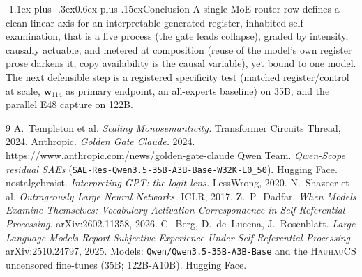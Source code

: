 \documentclass[10pt]{article}
\makeatletter
\renewcommand\section{\@startsection{section}{1}{\z@}%
  {-1.1ex plus -.3ex}{0.6ex plus .15ex}{\normalfont\large\bfseries}}
\newcommand{\wvec}{\mathbf{w}_{114}}
\makeatother
\begin{document}
\vspace{-0.4em}
\section{Conclusion}
\vspace{-0.2em}
A single MoE router row defines a clean linear axis for an interpretable generated
register, inhabited self-examination, that is a live process (the gate leads
collapse), graded by intensity, causally actuable, and metered at composition
(reuse of the model's own register prose darkens it; copy availability is the
causal variable), yet bound to one model. The
next defensible step is a registered specificity test (matched register/control at
scale, $\wvec$ as primary endpoint, an all-experts baseline) on 35B, and the
parallel E48 capture on 122B.

\vspace{-0.5em}
{\tiny \raggedright
\begin{thebibliography}{9}\setlength{\itemsep}{-1.0ex}\setlength{\parsep}{0pt}
 A.~Templeton et al. \emph{Scaling Monosemanticity.} Transformer Circuits Thread, 2024.
 Anthropic. \emph{Golden Gate Claude.} 2024. \url{https://www.anthropic.com/news/golden-gate-claude}
 Qwen Team. \emph{Qwen-Scope residual SAEs} (\texttt{SAE-Res-Qwen3.5-35B-A3B-Base-W32K-L0\_50}). Hugging Face.
 nostalgebraist. \emph{Interpreting GPT: the logit lens.} LessWrong, 2020.
 N.~Shazeer et al. \emph{Outrageously Large Neural Networks.} ICLR, 2017.
 Z.~P.~Dadfar. \emph{When Models Examine Themselves: Vocabulary-Activation Correspondence in Self-Referential Processing.} arXiv:2602.11358, 2026.
 C.~Berg, D.~de~Lucena, J.~Rosenblatt. \emph{Large Language Models Report Subjective Experience Under Self-Referential Processing.} arXiv:2510.24797, 2025.
 Models: \texttt{Qwen/Qwen3.5-35B-A3B-Base} and the \textsc{HauhauCS} uncensored fine-tunes (35B; 122B-A10B). Hugging Face.
\end{thebibliography}
}
\end{document}
